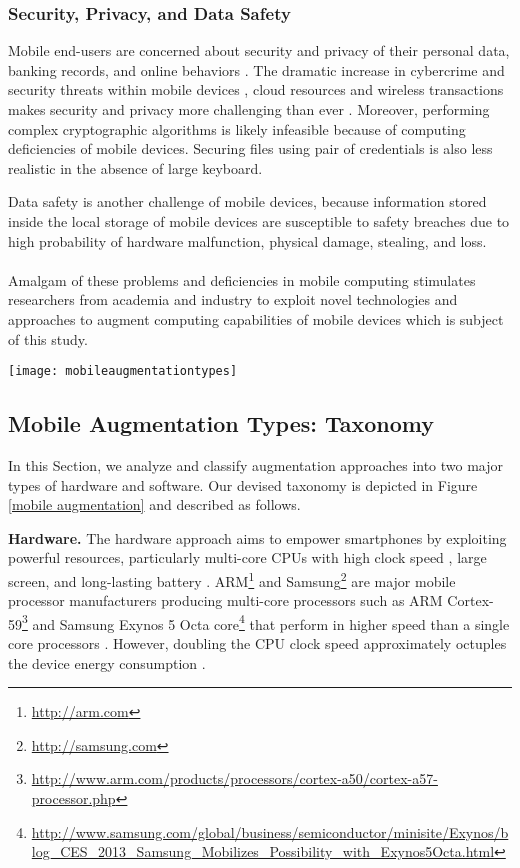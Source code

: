 \documentclass[publish]{IEEEtran}
\begin{document}
\subsubsection{Security, Privacy, and Data Safety}
Mobile end-users are concerned about security and privacy of their personal data, banking records, and online behaviors \cite{Survey2011}. The dramatic increase in cybercrime and security threats within mobile devices \cite{LaPollatobepublished}, cloud resources \cite{Xiao2013} and wireless transactions makes security and privacy more challenging than ever \cite{CHRISTIANCACHIN2011}. Moreover, performing complex cryptographic algorithms is likely infeasible because of computing deficiencies of mobile devices. Securing files using pair of credentials is also less realistic in the absence of large keyboard.

Data safety is another challenge of mobile devices, because information stored inside the local storage of mobile devices are susceptible to safety breaches due to high probability of hardware malfunction, physical damage, stealing, and loss. 
\\
\\
\noindent Amalgam of these problems and deficiencies in mobile computing stimulates researchers from academia and industry to exploit novel technologies and approaches to augment computing capabilities of mobile devices which is subject of this study.

\begin{figure*} [t]
\centering
\texttt{[image: mobileaugmentationtypes]}
\caption{Taxonomy of Mobile Augmentation Types.} \label{mobile augmentation}
\end{figure*}

\subsection{Mobile Augmentation Types: Taxonomy} \label{taxonomyofaugmentationapproach}
In this Section, we analyze and classify augmentation approaches into two major types of hardware and software. Our devised taxonomy is depicted in Figure \ref{mobile augmentation} and described as follows. 

\noindent \textbf{Hardware.} \label{hardware augmentation}
The hardware approach aims to empower smartphones by exploiting powerful resources, particularly multi-core CPUs with high clock speed \cite{multicore-nvidia}, large screen, and long-lasting battery \cite{ARM2009,KelseyJackson2009}.  
ARM\footnote{\url{http://arm.com}} and Samsung\footnote{\url{http://samsung.com}} are major mobile processor manufacturers producing multi-core processors such as ARM Cortex-59\footnote{\url{http://www.arm.com/products/processors/cortex-a50/cortex-a57-processor.php}} and Samsung Exynos 5 Octa core\footnote{\url{http://www.samsung.com/global/business/semiconductor/minisite/Exynos/blog\_CES\_2013\_Samsung\_Mobilizes\_Possibility\_with\_Exynos5Octa.html}} 
that perform in higher speed than a single core processors \cite{multicore-nvidia}. However, doubling the CPU clock speed approximately octuples the device energy consumption \cite{Kumar2012}. 
\end{document}
